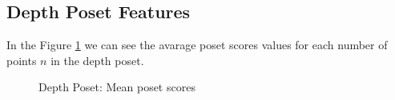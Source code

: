\documentclass{article}
\begin{document}
\subsection{Depth Poset Features}
\par In the Figure \ref{fig:scores_poset_mean} we can see the avarage poset scores values for each number of points $n$ in the depth poset.
\begin{figure}[ht]
  \vspace{-96pt}
  \centering
  \hspace*{-0.19\textwidth}
  \caption{Depth Poset: Mean poset scores}
  \label{fig:scores_poset_mean}
\end{figure}
\end{document}
